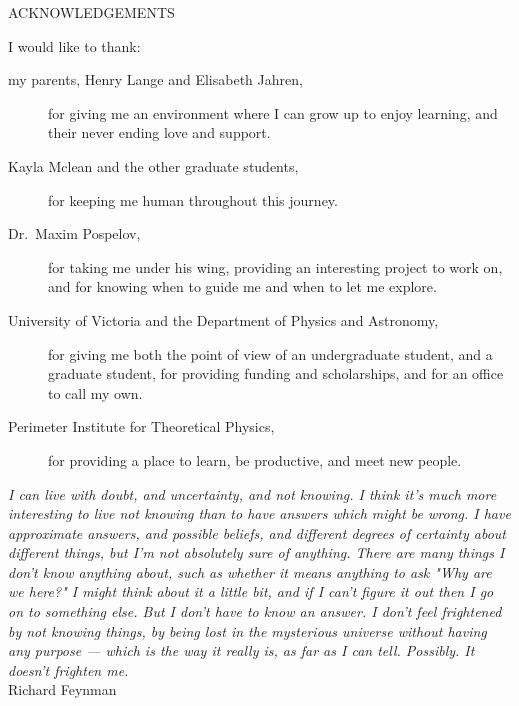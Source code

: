 \newpage
{}

\begin{center}
ACKNOWLEDGEMENTS
\end{center}

\noindent I would like to thank:
\begin{description}
\item[my parents, Henry Lange and Elisabeth Jahren,]
    for giving me an environment where I can grow up to enjoy learning, and their never ending love and support.
\item[Kayla Mclean and the other graduate students,]
    for keeping me human throughout this journey.
\item[Dr.~Maxim Pospelov,]
    for taking me under his wing, providing an interesting project to work on, and for knowing when to guide me and when to let me explore.
\item[University of Victoria and the Department of Physics and Astronomy,]
    for giving me both the point of view of an undergraduate student, and a graduate student, for providing funding and scholarships, and for an office to call my own.
\item[Perimeter Institute for Theoretical Physics,]
    for providing a place to learn, be productive, and meet new people.
\end{description}

\begin{flushright}
\textit{I can live with doubt, and uncertainty, and not
knowing. I think it's much more interesting to live not
knowing than to have answers which might be wrong.
I have approximate answers, and possible beliefs,
and different degrees of certainty about different things,
but I'm not absolutely sure of anything.
There are many things I don't know anything about,
such as whether it means anything to ask "Why are we here?"
I might think about it a little bit, and if I can't
figure it out then I go on to something else.
But I don't have to know an answer.
I don't feel frightened by not knowing things,
by being lost in the mysterious universe without having any purpose —
which is the way it really is, as far as I can tell.
Possibly. It doesn't frighten me.}
\\
Richard Feynman\\
\end{flushright}
